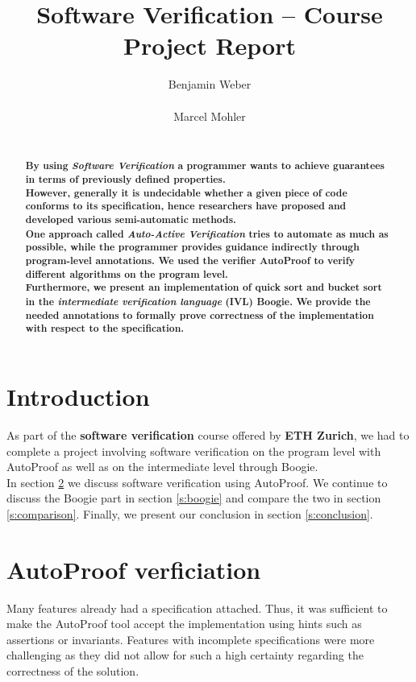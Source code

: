 \documentclass{report}
\title{Software Verification -- Course Project Report}
\author{
%
%
\alignauthor Benjamin Weber\\
	\affaddr{ETH ID 11-933-017}\\
	\email{benweber@student.ethz.ch}
\alignauthor Marcel Mohler\\
	\affaddr{ETH ID 09-922-998}\\
	\email{mohlerm@student.ethz.ch}
}
\begin{document}
\maketitle

\begin{abstract}
\textbf{By using \textit{Software Verification} a programmer wants to achieve guarantees in terms of previously defined properties.\\
However, generally it is undecidable whether a given piece of code conforms to its specification, hence researchers have proposed and developed various semi-automatic methods.\\
One approach called \textit{Auto-Active Verification} tries to automate as much as possible, while the programmer provides guidance indirectly through program-level annotations\cite{tschannen2011verifying}\cite{autoactivelecture}.
We used the verifier AutoProof\cite{autoproof} to verify different algorithms on the program level. \\Furthermore, we present an implementation of quick sort\cite{quicksort} and bucket sort\cite{bucketsort} in the \textit{intermediate verification language} (IVL) Boogie\cite{barnett2006boogie}\cite{boogie}. We provide the needed annotations to formally prove correctness of the implementation with respect to the specification.
}
\end{abstract}

\section{Introduction}
\label{s:introduction}
As part of the \textbf{software verification} course offered by \textbf{ETH Zurich},
we had to complete a project involving software verification on the program
level with AutoProof as well as on the intermediate level through Boogie.\\
In section \ref{s:autoproof} we discuss software verification using AutoProof.
We continue to discuss the Boogie part in section \ref{s:boogie} and compare
the two in section \ref{s:comparison}. Finally, we present our conclusion in
section \ref{s:conclusion}.

\section{AutoProof verficiation}
\label{s:autoproof}

Many features already had a specification attached. Thus, it was sufficient to
make the AutoProof tool accept the implementation using hints such as assertions
or invariants. Features with incomplete specifications were more challenging as
they did not allow for such a high certainty regarding the correctness of the
solution.
\end{document}
